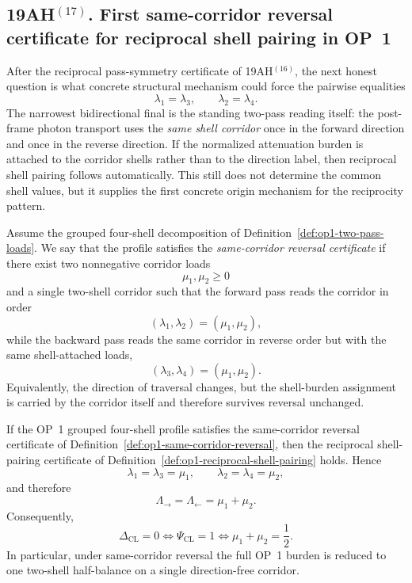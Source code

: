 \subsection*{19AH$^{(17)}$. First same-corridor reversal certificate for reciprocal shell pairing in OP~1}
After the reciprocal pass-symmetry certificate of 19AH$^{(16)}$, the next honest question is what concrete structural mechanism could force the pairwise equalities
\[
 \lambda_1=\lambda_3,
 \qquad
 \lambda_2=\lambda_4.
\]
The narrowest bidirectional final is the standing two-pass reading itself: the post-frame photon transport uses the \emph{same shell corridor} once in the forward direction and once in the reverse direction. If the normalized attenuation burden is attached to the corridor shells rather than to the direction label, then reciprocal shell pairing follows automatically. This still does not determine the common shell values, but it supplies the first concrete origin mechanism for the reciprocity pattern.

\begin{definition}
\label{def:op1-same-corridor-reversal}
Assume the grouped four-shell decomposition of Definition~\ref{def:op1-two-pass-loads}. We say that the profile satisfies the \emph{same-corridor reversal certificate} if there exist two nonnegative corridor loads
\[
 \mu_1,\mu_2\ge 0
\]
and a single two-shell corridor such that the forward pass reads the corridor in order
\[
 (\lambda_1,\lambda_2)=(\mu_1,\mu_2),
\]
while the backward pass reads the same corridor in reverse order but with the same shell-attached loads,
\[
 (\lambda_3,\lambda_4)=(\mu_1,\mu_2).
\]
Equivalently, the direction of traversal changes, but the shell-burden assignment is carried by the corridor itself and therefore survives reversal unchanged.
\end{definition}

\begin{proposition}
\label{prop:op1-same-corridor-implies-reciprocity}
If the OP~1 grouped four-shell profile satisfies the same-corridor reversal certificate of Definition~\ref{def:op1-same-corridor-reversal}, then the reciprocal shell-pairing certificate of Definition~\ref{def:op1-reciprocal-shell-pairing} holds. Hence
\[
 \lambda_1=\lambda_3=\mu_1,
 \qquad
 \lambda_2=\lambda_4=\mu_2,
\]
and therefore
\[
 \Lambda_{\rightarrow}=\Lambda_{\leftarrow}=\mu_1+\mu_2.
\]
Consequently,
\[
 \Delta_{\mathrm{CL}}=0
 \iff
 \Psi_{\mathrm{CL}}=1
 \iff
 \mu_1+\mu_2=\frac12.
\]
In particular, under same-corridor reversal the full OP~1 burden is reduced to one two-shell half-balance on a single direction-free corridor.
\end{proposition}

